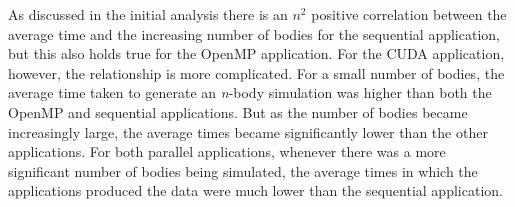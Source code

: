 \documentclass[12pt,journal,transmag]{IEEEtran}
\begin{document}
	\begin{table}[!h]
		\caption{1000 Iterations N-Body Simulation}
		\label{comptable}
		\centering
	\end{table}

	As discussed in the initial analysis there is an $n^2$ positive correlation between the average time and the increasing number of bodies for the sequential application, but this also holds true for the OpenMP application. For the CUDA application, however, the relationship is more complicated. For a small number of bodies, the average time taken to generate an \textit{n}-body simulation was higher than both the OpenMP and sequential applications. But as the number of bodies became increasingly large, the average times became significantly lower than the other applications. For both parallel applications, whenever there was a more significant number of bodies being simulated, the average times in which the applications produced the data were much lower than the sequential application.
	
\end{document}
